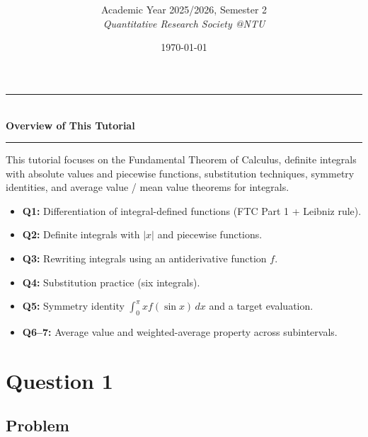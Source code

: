 \documentclass[12pt]{article}
\title{
\CourseCode \CourseName \\[0.3em]
\large \DocType
}
\author{
  Academic Year 2025/2026, Semester 2 \\[0.25em]
  \textit{Quantitative Research Society @NTU}
}
\date{\today}
\begin{document}

\maketitle
\thispagestyle{plainfirst}
\pagestyle{main}

\bigskip


\begin{center}
\rule{0.8\textwidth}{0.4pt}\\[4pt]
\textbf{Overview of This Tutorial}\\[2pt]
\rule{0.8\textwidth}{0.4pt}
\end{center}

\noindent
This tutorial focuses on the Fundamental Theorem of Calculus, definite integrals with absolute values and piecewise functions, substitution techniques, symmetry identities, and average value / mean value theorems for integrals.

\begin{itemize}[leftmargin=*]
\item \textbf{Q1:} Differentiation of integral-defined functions (FTC Part 1 + Leibniz rule).
\item \textbf{Q2:} Definite integrals with \(|x|\) and piecewise functions.
\item \textbf{Q3:} Rewriting integrals using an antiderivative function \(f\).
\item \textbf{Q4:} Substitution practice (six integrals).
\item \textbf{Q5:} Symmetry identity \(\int_0^\pi x f(\sin x)\,dx\) and a target evaluation.
\item \textbf{Q6--7:} Average value and weighted-average property across subintervals.
\end{itemize}

\bigskip


\newpage

\section*{Question 1}

\subsection*{Problem}
\end{document}
